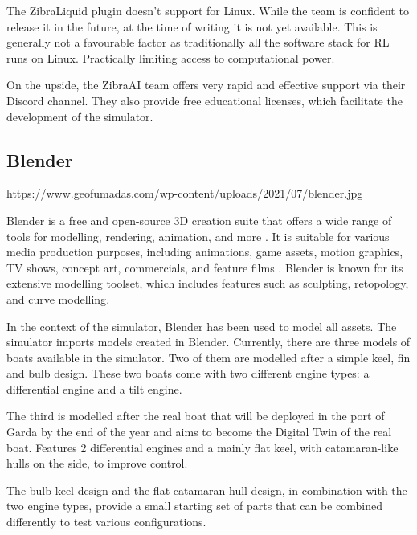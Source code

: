 \begin{textblock}
The ZibraLiquid plugin doesn't support for Linux. While the team is confident to release it in the future, at the time of writing it is not yet available. This is generally not a favourable factor as traditionally all the software stack for RL runs on Linux. Practically limiting access to computational power.

On the upside, the ZibraAI team offers very rapid and effective support via their Discord channel. They also provide free educational licenses, which facilitate the development of the simulator.

\end{textblock}


\subsection{Blender}
{https://www.geofumadas.com/wp-content/uploads/2021/07/blender.jpg}

\begin{textblock}
Blender is a free and open-source 3D creation suite that offers a wide range of tools for modelling, rendering, animation, and more \cite{blenderdocs}. It is suitable for various media production purposes, including animations, game assets, motion graphics, TV shows, concept art, commercials, and feature films \cite{blenderdocs}. Blender is known for its extensive modelling toolset, which includes features such as sculpting, retopology, and curve modelling\cite{blenderweb}.

In the context of the simulator, Blender has been used to model all assets. The simulator imports models created in Blender. Currently, there are three models of boats available in the simulator. Two of them are modelled after a simple keel, fin and bulb design. These two boats come with two different engine types: a differential engine and a tilt engine.

The third is modelled after the real boat that will be deployed in the port of Garda by the end of the year and aims to become the Digital Twin of the real boat. Features 2 differential engines and a mainly flat keel, with catamaran-like hulls on the side, to improve control.

The bulb keel design and the flat-catamaran hull design, in combination with the two engine types, provide a small starting set of parts that can be combined differently to test various configurations.

\end{textblock}


